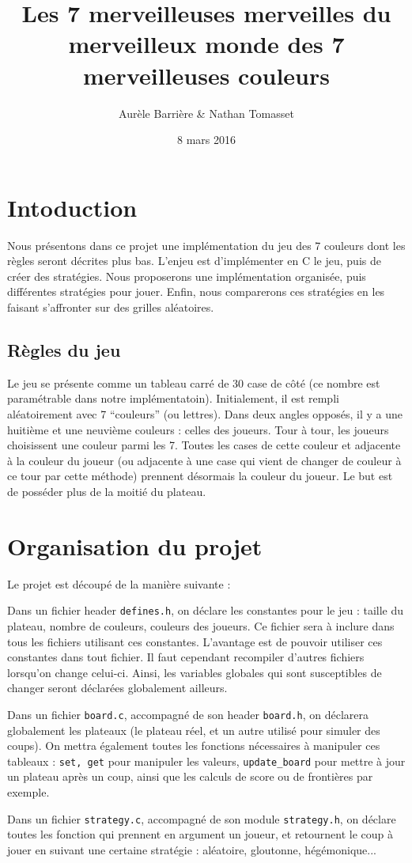 \documentclass[12pt]{article}
\title{Les 7 merveilleuses merveilles du merveilleux monde des 7 merveilleuses couleurs}
\author{Aurèle Barrière \& Nathan Tomasset}
\date{8 mars 2016}
\def\question#1{\subsection*{#1}}
\def\sec#1{\section{#1}}
\begin{document}
\maketitle
\tableofcontents
\newpage

\sec{Intoduction}
Nous présentons dans ce projet une implémentation du jeu des 7 couleurs dont les règles seront décrites plus bas. L'enjeu est d'implémenter en C le jeu, puis de créer des stratégies.
Nous proposerons une implémentation organisée, puis différentes stratégies pour jouer. Enfin, nous comparerons ces stratégies en les faisant s'affronter sur des grilles aléatoires.


\question{Règles du jeu}
Le jeu se présente comme un tableau carré de 30 case de côté (ce nombre est paramétrable dans notre implémentatoin). Initialement, il est rempli aléatoirement avec 7 ``couleurs'' (ou lettres). Dans deux angles opposés, il y a une huitième et une neuvième couleurs : celles des joueurs. Tour à tour, les joueurs choisissent une couleur parmi les 7. Toutes les cases de cette couleur et adjacente à la couleur du joueur (ou adjacente à une case qui vient de changer de couleur à ce tour par cette méthode) prennent désormais la couleur du joueur. Le but est de posséder plus de la moitié du plateau.

\sec{Organisation du projet}
Le projet est découpé de la manière suivante :

Dans un fichier header \texttt{defines.h}, on déclare les constantes pour le jeu : taille du plateau, nombre de couleurs, couleurs des joueurs. Ce fichier sera à inclure dans tous les fichiers utilisant ces constantes.
L'avantage est de pouvoir utiliser ces constantes dans tout fichier. Il faut cependant recompiler d'autres fichiers lorsqu'on change celui-ci. Ainsi, les variables globales qui sont susceptibles de changer seront déclarées globalement ailleurs.

Dans un fichier \texttt{board.c}, accompagné de son header \texttt{board.h}, on déclarera globalement les plateaux (le plateau réel, et un autre utilisé pour simuler des coups). On mettra également toutes les fonctions nécessaires à manipuler ces tableaux : \texttt{set, get} pour manipuler les valeurs, \texttt{update\_board} pour mettre à jour un plateau après un coup, ainsi que les calculs de score ou de frontières par exemple.

Dans un fichier \texttt{strategy.c}, accompagné de son module \texttt{strategy.h}, on déclare toutes les fonction qui prennent en argument un joueur, et retournent le coup à jouer en suivant une certaine stratégie : aléatoire, gloutonne, hégémonique...
\end{document}

